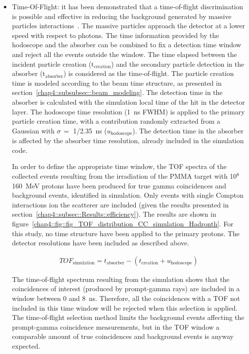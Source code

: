 \begin{itemize}
\item Time-Of-Flight: it has been demonstrated that a time-of-flight discrimination is possible and effective in reducing the background generated by massive particles interactions~\parencite{Testa2010}. The massive particles approach the detector at a lower speed with respect to photons. The time information provided by the hodoscope and the absorber can be combined to fix a detection time window and reject all the events outside the window. The time elapsed between the incident particle creation ($\mathrm{t_{creation}}$) and the secondary particle detection in the absorber ($\mathrm{t_{absorber}}$) is considered as the time-of-flight. The particle creation time is modeled according to the beam time structure, as presented in section~\ref{chap4::subsubsec::beam_modeling}. The detection time in the absorber is calculated with the simulation local time of the hit in the detector layer. The hodoscope time resolution (1~ns FWHM) is applied to the primary particle creation time, with a contribution randomly extracted from a Gaussian with $\sigma\,=$ 1/2.35~ns ($u_{\mathrm{hodoscope}}$). The detection time in the absorber is affected by the absorber time resolution, already included in the simulation code.

In order to define the appropriate time window, the TOF spectra of the collected events resulting from the irradiation of the PMMA target with 10$^{8}$ 160~MeV protons have been produced for true gamma coincidences and background events, identified in simulation. Only events with single Compton interactions ion the scatterer are included (given the results presented in section~\ref{chap4::subsec::Results::efficiency}). The results are shown in figure~\ref{chap4::fig::fig_TOF_distribution_CC_simulation_Hadronth}. For this study, no time structure have been applied to the primary protons. The detector resolutions have been included as described above.  

 \begin{eqnarray}
TOF_{\mathrm{simulation}} = t_{\mathrm{absorber}}-(t_{\mathrm{creation}} + u_{\mathrm{hodoscope}})
\label{chap4::eq::TOF_equation}
\end{eqnarray} 

The time-of-flight spectrum resulting from the simulation shows that the coincidences of interest (produced by prompt-gamma rays) are included in a window between 0 and 8~ns. Therefore, all the coincidences with a TOF not included in this time window will be rejected when this selection is applied. The time-of-flight selection method limits the background events affecting the prompt-gamma coincidence measurements, but in the TOF window a comparable amount of true coincidences and background events is anyway expected. 


\end{itemize}
